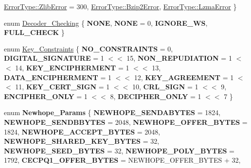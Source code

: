 \begin{DoxyCompactItemize}
\newline
\hyperlink{namespace_botan_a8bcd10518370fbf2dcfcb62b17346b94ab405ddaf4d789d423e1d697175d3eb22}{Error\+Type\+::\+Zlib\+Error} = 300, 
\hyperlink{namespace_botan_a8bcd10518370fbf2dcfcb62b17346b94ac0cea232798fa5da1c6dc87337d46acb}{Error\+Type\+::\+Bzip2\+Error}, 
\hyperlink{namespace_botan_a8bcd10518370fbf2dcfcb62b17346b94ab16e737bbe48f0a588bc738417b3854e}{Error\+Type\+::\+Lzma\+Error}
 \}
\item 
enum \hyperlink{namespace_botan_acd5baf937a9984c39f8b44104dde76ae}{Decoder\+\_\+\+Checking} \{ {\bfseries N\+O\+NE}, 
{\bfseries N\+O\+NE} = 0, 
{\bfseries I\+G\+N\+O\+R\+E\+\_\+\+WS}, 
{\bfseries F\+U\+L\+L\+\_\+\+C\+H\+E\+CK}
 \}
\item 
enum \hyperlink{namespace_botan_aed0885e5c70627dd43827b966e727654}{Key\+\_\+\+Constraints} \{ \newline
{\bfseries N\+O\+\_\+\+C\+O\+N\+S\+T\+R\+A\+I\+N\+TS} = 0, 
{\bfseries D\+I\+G\+I\+T\+A\+L\+\_\+\+S\+I\+G\+N\+A\+T\+U\+RE} = 1 $<$$<$ 15, 
{\bfseries N\+O\+N\+\_\+\+R\+E\+P\+U\+D\+I\+A\+T\+I\+ON} = 1 $<$$<$ 14, 
{\bfseries K\+E\+Y\+\_\+\+E\+N\+C\+I\+P\+H\+E\+R\+M\+E\+NT} = 1 $<$$<$ 13, 
\newline
{\bfseries D\+A\+T\+A\+\_\+\+E\+N\+C\+I\+P\+H\+E\+R\+M\+E\+NT} = 1 $<$$<$ 12, 
{\bfseries K\+E\+Y\+\_\+\+A\+G\+R\+E\+E\+M\+E\+NT} = 1 $<$$<$ 11, 
{\bfseries K\+E\+Y\+\_\+\+C\+E\+R\+T\+\_\+\+S\+I\+GN} = 1 $<$$<$ 10, 
{\bfseries C\+R\+L\+\_\+\+S\+I\+GN} = 1 $<$$<$ 9, 
\newline
{\bfseries E\+N\+C\+I\+P\+H\+E\+R\+\_\+\+O\+N\+LY} = 1 $<$$<$ 8, 
{\bfseries D\+E\+C\+I\+P\+H\+E\+R\+\_\+\+O\+N\+LY} = 1 $<$$<$ 7
 \}
\item 
\mbox{\label{namespace_botan_a6afe4e4b818b57d67f00ee387c06721c}} 
enum {\bfseries Newhope\+\_\+\+Params} \{ \newline
{\bfseries N\+E\+W\+H\+O\+P\+E\+\_\+\+S\+E\+N\+D\+A\+B\+Y\+T\+ES} = 1824, 
{\bfseries N\+E\+W\+H\+O\+P\+E\+\_\+\+S\+E\+N\+D\+B\+B\+Y\+T\+ES} = 2048, 
{\bfseries N\+E\+W\+H\+O\+P\+E\+\_\+\+O\+F\+F\+E\+R\+\_\+\+B\+Y\+T\+ES} = 1824, 
{\bfseries N\+E\+W\+H\+O\+P\+E\+\_\+\+A\+C\+C\+E\+P\+T\+\_\+\+B\+Y\+T\+ES} = 2048, 
\newline
{\bfseries N\+E\+W\+H\+O\+P\+E\+\_\+\+S\+H\+A\+R\+E\+D\+\_\+\+K\+E\+Y\+\_\+\+B\+Y\+T\+ES} = 32, 
{\bfseries N\+E\+W\+H\+O\+P\+E\+\_\+\+S\+E\+E\+D\+\_\+\+B\+Y\+T\+ES} = 32, 
{\bfseries N\+E\+W\+H\+O\+P\+E\+\_\+\+P\+O\+L\+Y\+\_\+\+B\+Y\+T\+ES} = 1792, 
{\bfseries C\+E\+C\+P\+Q1\+\_\+\+O\+F\+F\+E\+R\+\_\+\+B\+Y\+T\+ES} = N\+E\+W\+H\+O\+P\+E\+\_\+\+O\+F\+F\+E\+R\+\_\+\+B\+Y\+T\+ES + 32, 
$$
\end{DoxyCompactItemize}
